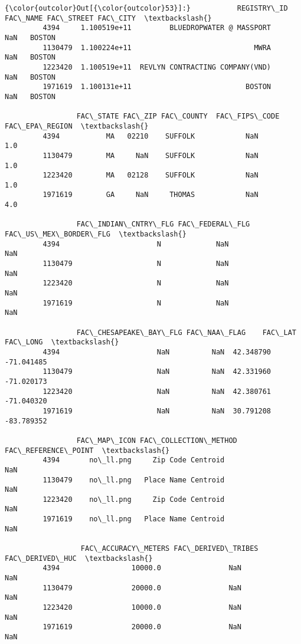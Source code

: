 \documentclass[11pt]{article}
\begin{document}
\begin{Verbatim}[commandchars=\\\{\}]
{\color{outcolor}Out[{\color{outcolor}53}]:}           REGISTRY\_ID                         FAC\_NAME FAC\_STREET FAC\_CITY  \textbackslash{}
         4394     1.100519e+11         BLUEDROPWATER @ MASSPORT        NaN   BOSTON   
         1130479  1.100224e+11                             MWRA        NaN   BOSTON   
         1223420  1.100519e+11  REVLYN CONTRACTING COMPANY(VND)        NaN   BOSTON   
         1971619  1.100131e+11                           BOSTON        NaN   BOSTON   
         
                 FAC\_STATE FAC\_ZIP FAC\_COUNTY  FAC\_FIPS\_CODE  FAC\_EPA\_REGION  \textbackslash{}
         4394           MA   02210    SUFFOLK            NaN             1.0   
         1130479        MA     NaN    SUFFOLK            NaN             1.0   
         1223420        MA   02128    SUFFOLK            NaN             1.0   
         1971619        GA     NaN     THOMAS            NaN             4.0   
         
                 FAC\_INDIAN\_CNTRY\_FLG FAC\_FEDERAL\_FLG FAC\_US\_MEX\_BORDER\_FLG  \textbackslash{}
         4394                       N             NaN                   NaN   
         1130479                    N             NaN                   NaN   
         1223420                    N             NaN                   NaN   
         1971619                    N             NaN                   NaN   
         
                 FAC\_CHESAPEAKE\_BAY\_FLG FAC\_NAA\_FLAG    FAC\_LAT   FAC\_LONG  \textbackslash{}
         4394                       NaN          NaN  42.348790 -71.041485   
         1130479                    NaN          NaN  42.331960 -71.020173   
         1223420                    NaN          NaN  42.380761 -71.040320   
         1971619                    NaN          NaN  30.791208 -83.789352   
         
                 FAC\_MAP\_ICON FAC\_COLLECTION\_METHOD FAC\_REFERENCE\_POINT  \textbackslash{}
         4394       no\_ll.png     Zip Code Centroid                 NaN   
         1130479    no\_ll.png   Place Name Centroid                 NaN   
         1223420    no\_ll.png     Zip Code Centroid                 NaN   
         1971619    no\_ll.png   Place Name Centroid                 NaN   
         
                  FAC\_ACCURACY\_METERS FAC\_DERIVED\_TRIBES  FAC\_DERIVED\_HUC  \textbackslash{}
         4394                 10000.0                NaN              NaN   
         1130479              20000.0                NaN              NaN   
         1223420              10000.0                NaN              NaN   
         1971619              20000.0                NaN              NaN   
         

\end{Verbatim}
\end{document}
